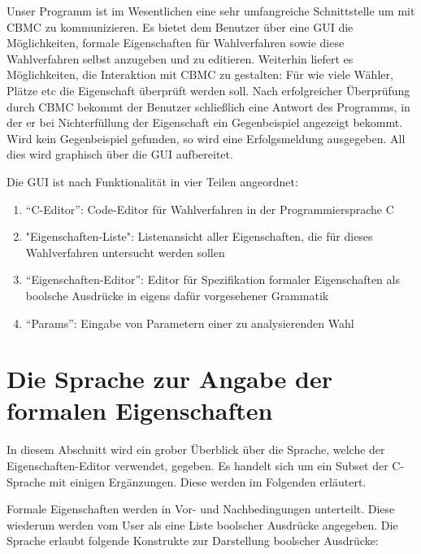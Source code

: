\documentclass[a4paper]{scrreprt}
\begin{document}
Unser Programm ist im Wesentlichen eine sehr umfangreiche Schnittstelle um mit \ac{CBMC} zu kommunizieren. Es bietet dem Benutzer über eine \ac{GUI} die Möglichkeiten, formale Eigenschaften für Wahlverfahren sowie diese Wahlverfahren selbst anzugeben und zu editieren. Weiterhin liefert es Möglichkeiten, die Interaktion mit \ac{CBMC} zu gestalten: Für wie viele Wähler, Plätze etc die Eigenschaft überprüft werden soll. Nach erfolgreicher Überprüfung durch \ac{CBMC} bekommt der Benutzer schließlich eine Antwort des Programms, in der er bei Nichterfüllung der Eigenschaft ein Gegenbeispiel angezeigt bekommt. Wird kein Gegenbeispiel gefunden, so wird eine Erfolgsmeldung ausgegeben. All dies wird graphisch über die \ac{GUI} aufbereitet.

Die \ac{GUI} ist nach Funktionalität in vier Teilen angeordnet:
\begin{enumerate}
\item "`C-Editor"': Code-Editor für Wahlverfahren in der Programmiersprache C
\item "Eigenschaften-Liste": Listenansicht aller Eigenschaften, die für dieses Wahlverfahren untersucht werden sollen
\item "`Eigenschaften-Editor"': Editor für Spezifikation formaler Eigenschaften als boolsche Ausdrücke in eigens dafür vorgesehener Grammatik
\item "`Params"': Eingabe von Parametern einer zu analysierenden Wahl
\end{enumerate}

\section{Die Sprache zur Angabe der formalen Eigenschaften} \label{Sprache-für-formale-Eigenschaften}
In diesem Abschnitt wird ein grober Überblick über die Sprache, welche der Eigenschaften-Editor verwendet, gegeben. Es handelt sich um ein Subset der C-Sprache mit einigen Ergänzungen. Diese werden im Folgenden erläutert. 

Formale Eigenschaften werden in Vor- und Nachbedingungen unterteilt. Diese wiederum werden vom User als eine Liste boolscher Ausdrücke angegeben. Die Sprache erlaubt folgende Konstrukte zur Darstellung boolscher Ausdrücke:
\end{document}

